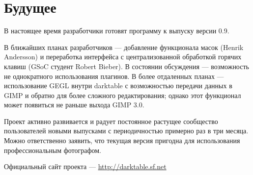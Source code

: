 \documentclass[10pt, a5paper]{article}
\begin{document}
\section*{Будущее}
В настоящее время разработчики готовят программу к выпуску версии 0.9. 

В ближайших планах разработчиков --- добавление функционала масок (Henrik Andersson) и переработка интерфейса с централизованной обработкой горячих клавиш (GSoC студент Robert Bieber). В состоянии обсуждения — возможность не  однократного использования плагинов. В более отдаленных планах — использование GEGL внутри darktable с возможностью передачи данных в GIMP и обратно для более сложного редактирования; однако этот функционал может появиться не раньше выхода GIMP 3.0.

Проект активно развивается и радует постоянное растущее сообщество пользователей новыми выпусками с периодичностью примерно раз в три месяца. Можно ответственно заявить, что текущая версия пригодна для использования профессиональным фотографом.

\begin{thebibliography}{9}
 Официальный сайт проекта --- \url{http://darktable.sf.net}
\end{thebibliography}
\end{document}
